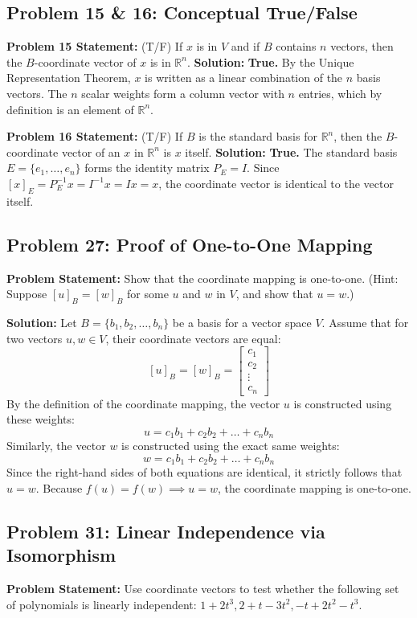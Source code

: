 \documentclass[11pt]{article}
\begin{document}
\subsection{Problem 15 \& 16: Conceptual True/False}
\textbf{Problem 15 Statement:} (T/F) If $x$ is in $V$ and if $B$ contains $n$ vectors, then the $B$-coordinate vector of $x$ is in $\mathbb{R}^n$.
\textbf{Solution:} \textbf{True.} By the Unique Representation Theorem, $x$ is written as a linear combination of the $n$ basis vectors. The $n$ scalar weights form a column vector with $n$ entries, which by definition is an element of $\mathbb{R}^n$.

\textbf{Problem 16 Statement:} (T/F) If $B$ is the standard basis for $\mathbb{R}^n$, then the $B$-coordinate vector of an $x$ in $\mathbb{R}^n$ is $x$ itself.
\textbf{Solution:} \textbf{True.} The standard basis $E = \{e_1, \dots, e_n\}$ forms the identity matrix $P_E = I$. Since $[x]_E = P_E^{-1} x = I^{-1} x = Ix = x$, the coordinate vector is identical to the vector itself.

\subsection{Problem 27: Proof of One-to-One Mapping}
\textbf{Problem Statement:} Show that the coordinate mapping is one-to-one. (Hint: Suppose $[u]_B = [w]_B$ for some $u$ and $w$ in $V$, and show that $u = w$.)

\textbf{Solution:}
Let $B = \{b_1, b_2, \dots, b_n\}$ be a basis for a vector space $V$. 
Assume that for two vectors $u, w \in V$, their coordinate vectors are equal:
\[ [u]_B = [w]_B = \begin{bmatrix} c_1 \\ c_2 \\ \vdots \\ c_n \end{bmatrix} \]
By the definition of the coordinate mapping, the vector $u$ is constructed using these weights:
\[ u = c_1 b_1 + c_2 b_2 + \dots + c_n b_n \]
Similarly, the vector $w$ is constructed using the exact same weights:
\[ w = c_1 b_1 + c_2 b_2 + \dots + c_n b_n \]
Since the right-hand sides of both equations are identical, it strictly follows that $u = w$. Because $f(u) = f(w) \implies u = w$, the coordinate mapping is one-to-one.

\subsection{Problem 31: Linear Independence via Isomorphism}
\textbf{Problem Statement:} Use coordinate vectors to test whether the following set of polynomials is linearly independent: $1+2t^3, 2+t-3t^2, -t+2t^2-t^3$.
\end{document}
